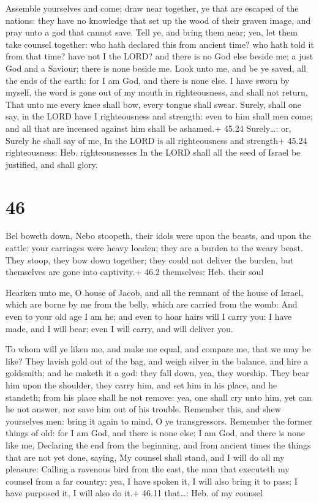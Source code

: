  Assemble yourselves and come; draw near together, ye
that are escaped of the nations: they have no knowledge that set up the
wood of their graven image, and pray unto a god that cannot save.
 Tell ye, and bring them near; yea, let them take counsel
together: who hath declared this from ancient time? who hath told it
from that time? have not I the LORD? and there is no God else beside me;
a just God and a Saviour; there is none beside me.  Look
unto me, and be ye saved, all the ends of the earth: for I am God, and
there is none else.  I have sworn by myself, the word is
gone out of my mouth in righteousness, and shall not return, That unto
me every knee shall bow, every tongue shall swear.  Surely,
shall one say, in the LORD have I righteousness and strength: even to
him shall men come; and all that are incensed against him shall be
ashamed.+ 45.24 Surely\ldots: or, Surely he shall say of me, In the LORD
is all righteousness and strength+ 45.24 righteousness: Heb.
righteousnesses  In the LORD shall all the seed of Israel
be justified, and shall glory.

\hypertarget{section-45}{%
\section{46}\label{section-45}}

 Bel boweth down, Nebo stoopeth, their idols were upon the
beasts, and upon the cattle: your carriages were heavy loaden; they are
a burden to the weary beast.  They stoop, they bow down
together; they could not deliver the burden, but themselves are gone
into captivity.+ 46.2 themselves: Heb. their soul

 Hearken unto me, O house of Jacob, and all the remnant of
the house of Israel, which are borne by me from the belly, which are
carried from the womb:  And even to your old age I am he;
and even to hoar hairs will I carry you: I have made, and I will bear;
even I will carry, and will deliver you.

 To whom will ye liken me, and make me equal, and compare
me, that we may be like?  They lavish gold out of the bag,
and weigh silver in the balance, and hire a goldsmith; and he maketh it
a god: they fall down, yea, they worship.  They bear him
upon the shoulder, they carry him, and set him in his place, and he
standeth; from his place shall he not remove: yea, one shall cry unto
him, yet can he not answer, nor save him out of his trouble.
 Remember this, and shew yourselves men: bring it again to
mind, O ye transgressors.  Remember the former things of
old: for I am God, and there is none else; I am God, and there is none
like me,  Declaring the end from the beginning, and from
ancient times the things that are not yet done, saying, My counsel shall
stand, and I will do all my pleasure:  Calling a ravenous
bird from the east, the man that executeth my counsel from a far
country: yea, I have spoken it, I will also bring it to pass; I have
purposed it, I will also do it.+ 46.11 that\ldots: Heb. of my counsel

